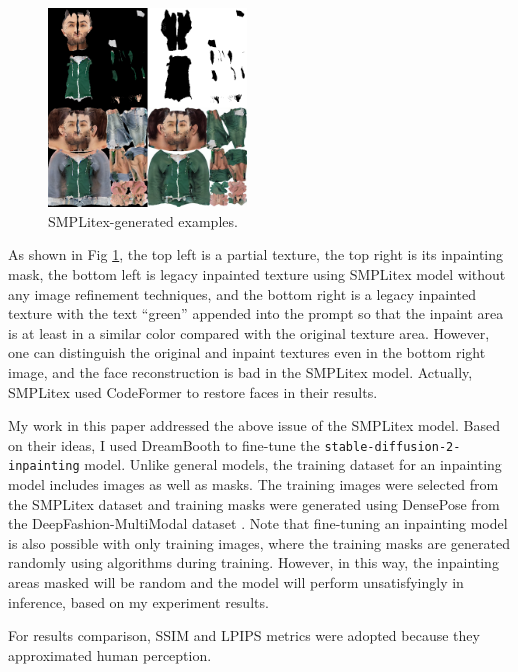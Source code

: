 \documentclass[acmtog]{acmart}
\begin{document}
\begin{figure}[h]
  \centering
  \includegraphics[width=0.47\textwidth]{figs/smplitex_sample.png}
  \caption{SMPLitex-generated examples.}
  \label{fig:smplitex_sample}
\end{figure}

As shown in Fig \ref{fig:smplitex_sample}, the top left is a partial texture, the top right is its inpainting mask, the bottom left is legacy inpainted texture using SMPLitex model without any image refinement techniques, and the bottom right is a legacy inpainted texture with the text ``green'' appended into the prompt so that the inpaint area is at least in a similar color compared with the original texture area. However, one can distinguish the original and inpaint textures even in the bottom right image, and the face reconstruction is bad in the SMPLitex model. Actually, SMPLitex used CodeFormer \cite{zhou2022towards} to restore faces in their results.

My work in this paper addressed the above issue of the SMPLitex model. Based on their ideas, I used DreamBooth to fine-tune the \texttt{stable-diffusion-2-inpainting} model. Unlike general models, the training dataset for an inpainting model includes images as well as masks. The training images were selected from the SMPLitex dataset and training masks were generated using DensePose from the DeepFashion-MultiModal dataset \cite{jiang2022text2human}. Note that fine-tuning an inpainting model is also possible with only training images, where the training masks are generated randomly using algorithms during training. However, in this way, the inpainting areas masked will be random and the model will perform unsatisfyingly in inference, based on my experiment results.

For results comparison, SSIM and LPIPS metrics were adopted because they approximated human perception.
\end{document}
